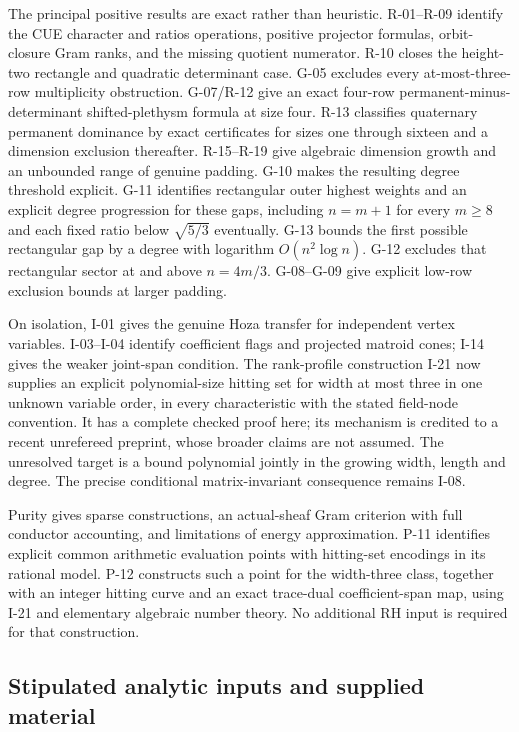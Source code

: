 \documentclass[11pt,a4paper]{article}
\theoremstyle{definition}\newtheorem{definition}{Definition}
\begin{document}
The principal positive results are exact rather than heuristic. R-01--R-09 identify the CUE character and ratios operations, positive projector formulas, orbit-closure Gram ranks, and the missing quotient numerator. R-10 closes the height-two rectangle and quadratic determinant case. G-05 excludes every at-most-three-row multiplicity obstruction. G-07/R-12 give an exact four-row permanent-minus-determinant shifted-plethysm formula at size four. R-13 classifies quaternary permanent dominance by exact certificates for sizes one through sixteen and a dimension exclusion thereafter. R-15--R-19 give algebraic dimension growth and an unbounded range of genuine padding. G-10 makes the resulting degree threshold explicit. G-11 identifies rectangular outer highest weights and an explicit degree progression for these gaps, including $n=m+1$ for every $m\geq8$ and each fixed ratio below $\sqrt{5/3}$ eventually. G-13 bounds the first possible rectangular gap by a degree with logarithm $O(n^2\log n)$. G-12 excludes that rectangular sector at and above $n=4m/3$. G-08--G-09 give explicit low-row exclusion bounds at larger padding.

On isolation, I-01 gives the genuine Hoza transfer for independent vertex variables. I-03--I-04 identify coefficient flags and projected matroid cones; I-14 gives the weaker joint-span condition. The rank-profile construction I-21 now supplies an explicit polynomial-size hitting set for width at most three in one unknown variable order, in every characteristic with the stated field-node convention. It has a complete checked proof here; its mechanism is credited to a recent unrefereed preprint, whose broader claims are not assumed. The unresolved target is a bound polynomial jointly in the growing width, length and degree. The precise conditional matrix-invariant consequence remains I-08.

Purity gives sparse constructions, an actual-sheaf Gram criterion with full conductor accounting, and limitations of energy approximation. P-11 identifies explicit common arithmetic evaluation points with hitting-set encodings in its rational model. P-12 constructs such a point for the width-three class, together with an integer hitting curve and an exact trace-dual coefficient-span map, using I-21 and elementary algebraic number theory. No additional RH input is required for that construction.

\subsection{Stipulated analytic inputs and supplied material}
\end{document}
